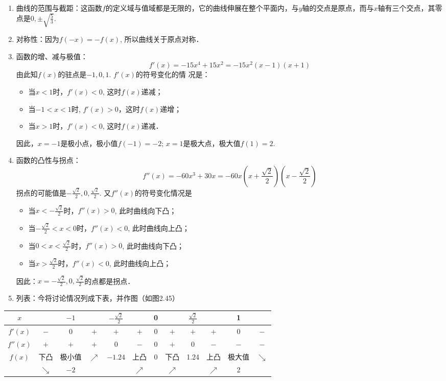     \begin{solution}
    \begin{enumerate}
    \item 曲线的范围与截距：这函数$f$的定义域与值域都是无限的，它的曲线伸展在整个平面内，与$y$轴的交点是原点，而与$x$轴有三个交点，其零点是$0,\pm\sqrt{\frac{5}{3}}$.
    \item 对称性：因为$f(-x)=-f(x)$, 所以曲线关于原点对称．
    \item 函数的增、减与极值：
    \[f' (x) =-15x^4+15x^2=-15x^2 (x-1) (x+1)\]
    由此知$f(x)$的驻点是$-1, 0, 1$. $f'(x)$的符号变化的情
    况是：
    \begin{itemize}
        \item 当$x<1$时，$f'(x)<0$, 这时$f(x)$递减；
        \item 当$-1<x<1$时, $f'(x)>0$，这时$f(x)$递增；
        \item 当$x>1$时，$f'(x)<0$, 这时$f(x)$递减．
    \end{itemize}
    因此，$x=-1$是极小点，极小值$f(-1)=-2$; $x=1$是极大点，极大值$f(1)=2$.
    \item 函数的凸性与拐点：
    \[f''(x)=-60x^3+30x=-60x\left(x+\frac{\sqrt{2}}{2}\right)\left(x-\frac{\sqrt{2}}{2}\right)\]
    拐点的可能值是$-\frac{\sqrt{2}}{2},0,\frac{\sqrt{2}}{2}$. 又$f''(x)$的符号变化情况是
    \begin{itemize}
        \item 当$x<-\frac{\sqrt{2}}{2}$时，$f''(x)>0$, 此时曲线向下凸；
        \item 当$-\frac{\sqrt{2}}{2}<x<0$时，$f''(x)<0$, 此时曲线向上凸；
        \item 当$0<x<\frac{\sqrt{2}}{2}$时，$f''(x)>0$, 此时曲线向下凸；
        \item 当$x>\frac{\sqrt{2}}{2}$时，$f''(x)<0$, 此时曲线向上凸；
    \end{itemize}
    因此：$x=-\frac{\sqrt{2}}{2},0,\frac{\sqrt{2}}{2}$的点都是拐点．
    
    \item 列表：今将讨论情况列成下表，并作图（如图2.45）
    \end{enumerate}    
    \begin{center}\small
        \begin{tabular}{cccccccccccc}
        \hline
        $x$ & &$-1$&&$-\frac{\sqrt{2}}{2}$&&0&&$\frac{\sqrt{2}}{2}$&&1\\
        \hline
        $f'(x)$& $-$ & 0&$+$&$+$&$+$&0&$+$&$+$&$+$&0&$-$\\
        $f''(x)$&$+$&$+$&$+$&0&$-$&0&$+$&0&$-$&$-$&$-$\\
        $f(x)$&下凸&极小值& $\nearrow$  & $-1.24$&上凸 & 0& 下凸 &1.24& 上凸 & 极大值 & $\searrow$  \\
        & $\searrow $ &$-2$&&&$\nearrow $&&$\nearrow $&&$\nearrow $&2\\
        \hline
        \end{tabular}
        \end{center}
        

\end{solution}
